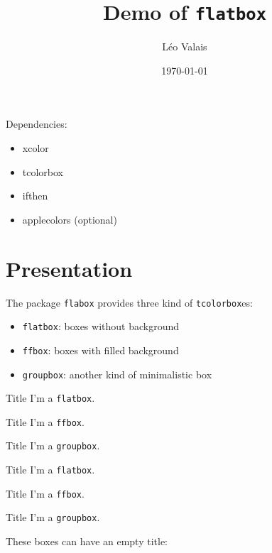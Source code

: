 \documentclass[a4paper]{article}
\title{Demo of \texttt{flatbox}}
\author{Léo Valais}
\date\today
\begin{document}
\maketitle

Dependencies:
\begin{itemize}
\item xcolor
\item tcolorbox
\item ifthen
\item applecolors (optional)
\end{itemize}

\section{Presentation}
The package \texttt{flabox} provides three kind of \texttt{tcolorbox}es:

\begin{itemize}
\item \texttt{flatbox}: boxes without background
\item \texttt{ffbox}: boxes with filled background
\item \texttt{groupbox}: another kind of minimalistic box
\end{itemize}

\begin{flatbox}{Title}
I'm a \texttt{flatbox}.
\end{flatbox}

\begin{ffbox}{Title}
I'm a \texttt{ffbox}.
\end{ffbox}

\begin{groupbox}{Title}
I'm a \texttt{groupbox}.
\end{groupbox}

\begin{latexcode}
\begin{flatbox}{Title}
I'm a \texttt{flatbox}.
\end{flatbox}

\begin{ffbox}{Title}
I'm a \texttt{ffbox}.
\end{ffbox}

\begin{groupbox}{Title}
I'm a \texttt{groupbox}.
\end{groupbox}
\end{latexcode}

These boxes can have an empty title:
\end{document}
